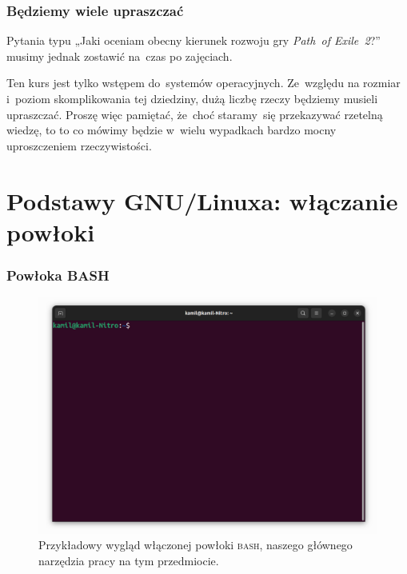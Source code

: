 \documentclass[10pt,t]{beamer}
\begin{document}
\begin{frame}
  \frametitle{Będziemy wiele upraszczać}


  Pytania typu „Jaki oceniam obecny kierunek rozwoju gry \textit{Path~of
    Exile~2}?” musimy jednak zostawić na~czas po zajęciach.

  Ten kurs jest tylko \alert{wstępem} do~systemów operacyjnych. Ze~względu
  na rozmiar i~poziom skomplikowania tej dziedziny, dużą liczbę rzeczy
  będziemy musieli \alert{upraszczać}. Proszę więc pamiętać, że~choć
  staramy~się przekazywać rzetelną wiedzę, to to co mówimy będzie w~wielu
  wypadkach bardzo mocny uproszczeniem rzeczywistości.

\end{frame}










\section{Podstawy GNU/Linuxa: włączanie powłoki}


\begin{frame}
  \frametitle{Powłoka BASH}

  \vspace{-0.5em}


  \begin{figure}

    \label{fig:BASH-shell}

    \centering


    \includegraphics[scale=0.23]
    {./Presentations-pictures/Miscancellous-pictures/BASH-shell.png}


    \caption{Przykładowy wygląd włączonej powłoki \textsc{bash}, naszego
      głównego narzędzia pracy na tym przedmiocie.}

  \end{figure}

\end{frame}
\end{document}

